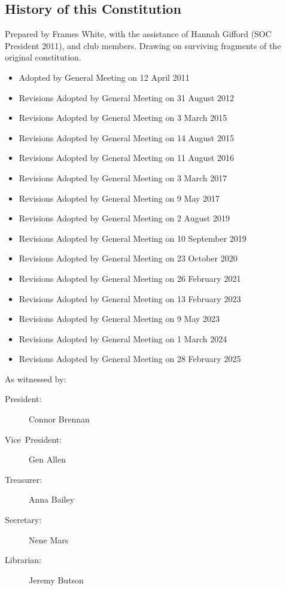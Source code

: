 \documentclass[a4paper]{article}
\begin{document}
\begin{appendices}

    \section{History of this Constitution} \label{sec:app:history}

    \noindent Prepared by Frames White, with the assistance of Hannah Gifford (SOC President 2011), and club members. Drawing on surviving fragments of the original constitution.

    \medskip{}

    \begin{itemize}[label={}]
        \item Adopted by General Meeting on 12 April 2011
        \item Revisions Adopted by General Meeting on 31 August 2012
        \item Revisions Adopted by General Meeting on 3 March 2015
        \item Revisions Adopted by General Meeting on 14 August 2015
        \item Revisions Adopted by General Meeting on 11 August 2016
        \item Revisions Adopted by General Meeting on 3 March 2017
        \item Revisions Adopted by General Meeting on 9 May 2017
        \item Revisions Adopted by General Meeting on 2 August 2019
        \item Revisions Adopted by General Meeting on 10 September 2019
        \item Revisions Adopted by General Meeting on 23 October 2020
        \item Revisions Adopted by General Meeting on 26 February 2021
        \item Revisions Adopted by General Meeting on 13 February 2023
        \item Revisions Adopted by General Meeting on 9 May 2023
        \item Revisions Adopted by General Meeting on 1 March 2024
        \item Revisions Adopted by General Meeting on 28 February 2025
    \end{itemize}

    \medskip{}

    \noindent As witnessed by:
    \begin{description}
        \item[{President:}] Connor Brennan
        \item[{Vice~President:}] Gen Allen
        \item[{Treasurer:}] Anna Bailey
        \item[{Secretary:}] Nene Mars
        \item[{Librarian:}] Jeremy Butson
    \end{description}

\end{appendices}
\end{document}
